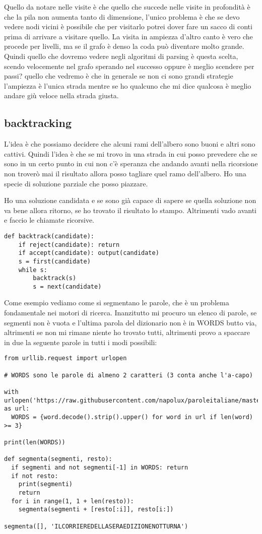 Quello da notare nelle visite è che quello che succede nelle visite in profondità è che la pila non aumenta tanto di dimensione, l'unico problema è che se devo vedere nodi vicini è possibile che per visitarlo potrei dover fare un sacco di conti prima di arrivare a visitare quello. 
La visita in ampiezza d'altro canto è vero che procede per livelli, ma se il grafo è denso la coda può diventare molto grande. Quindi quello che dovremo vedere negli algoritmi di parsing è questa scelta, scendo velocemente nel grafo sperando nel successo oppure è meglio scendere per passi? quello che vedremo è che in generale se non ci sono grandi strategie l'ampiezza è l'unica strada mentre se ho qualcuno che mi dice qualcosa è meglio andare giù veloce nella strada giusta.

\subsection{backtracking}
L'idea è che possiamo decidere che alcuni rami dell'albero sono buoni e altri sono cattivi. Quindi l'idea è che se mi trovo in una strada in cui posso prevedere che se sono in un certo punto in cui non c'è speranza che andando avanti nella ricorsione non troverò mai il risultato allora posso tagliare quel ramo dell'albero. Ho una specie di soluzione parziale che posso piazzare.

Ho una soluzione candidata e se sono già capace di sapere se quella soluzione non va bene allora ritorno, se ho trovato il risultato lo stampo. Altrimenti vado avanti e faccio le chiamate ricorsive.

\begin{lstlisting}
def backtrack(candidate):
    if reject(candidate): return
    if accept(candidate): output(candidate)
    s = first(candidate)
    while s:
        backtrack(s)
        s = next(candidate)
\end{lstlisting}

Come esempio vediamo come si segmentano le parole, che è un problema fondamentale nei motori di ricerca. Inanzitutto mi procuro un elenco di parole, se segmenti non è vuota e l'ultima parola del dizionario non è in WORDS butto via, altrimenti se non mi rimane niente ho trovato tutti, altrimenti provo a spaccare in due la seguente parole in tutti i modi possibili:
\begin{lstlisting}
from urllib.request import urlopen

# WORDS sono le parole di almeno 2 caratteri (3 conta anche l'a-capo)

with urlopen('https://raw.githubusercontent.com/napolux/paroleitaliane/master/paroleitaliane/60000_parole_italiane.txt') as url: 
  WORDS = {word.decode().strip().upper() for word in url if len(word) >= 3}

print(len(WORDS))

def segmenta(segmenti, resto):
  if segmenti and not segmenti[-1] in WORDS: return
  if not resto: 
    print(segmenti)
    return
  for i in range(1, 1 + len(resto)):
    segmenta(segmenti + [resto[:i]], resto[i:])

segmenta([], 'ILCORRIEREDELLASERAEDIZIONENOTTURNA')
\end{lstlisting}
